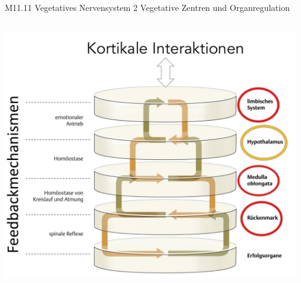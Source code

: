 \documentclass{beamer}
\begin{document}
 
\begin{frame}{M11.11 Vegetatives Nervensystem 2 Vegetative Zentren und Organregulation}
    \begin{columns}[c]
    
    \begin{column}{5cm}
    \begin{center}
        \includegraphics[width=\textwidth]{vns2_zentren.png}


    \end{center}
    \end{column}


    
    \begin{column}{5cm}
    

\end{column}
\end{columns}
\end{frame}
\end{document}
